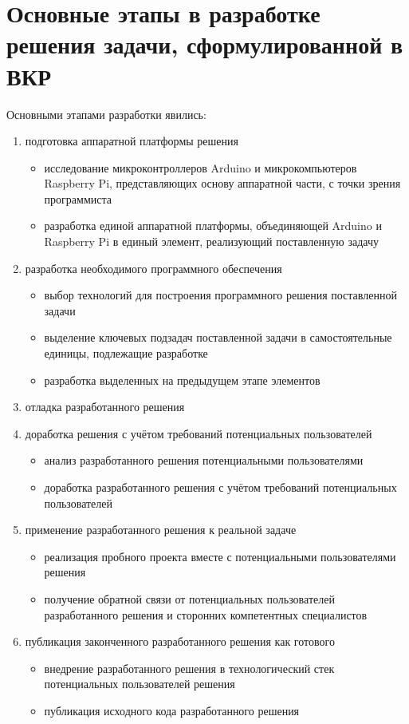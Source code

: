 \section{Основные этапы в разработке решения задачи, сформулированной в ВКР}
Основными этапами разработки явились:
\begin{enumerate}
\item подготовка аппаратной платформы решения 
\begin{itemize}
    \item исследование микроконтроллеров Arduino и микрокомпьютеров Raspberry Pi, представляющих основу аппаратной части, с точки зрения программиста
    \item разработка единой аппаратной платформы, объединяющей Arduino и Raspberry Pi в единый элемент, реализующий поставленную задачу
\end{itemize}

\item разработка необходимого программного обеспечения
\begin{itemize}
    \item выбор технологий для построения программного решения поставленной задачи
    \item выделение ключевых подзадач поставленной задачи в самостоятельные единицы, подлежащие разработке
    \item разработка выделенных на предыдущем этапе элементов
\end{itemize}

\item отладка разработанного решения

\item доработка решения с учётом требований потенциальных пользователей
\begin{itemize}
    \item анализ разработанного решения потенциальными пользователями
    \item доработка разработанного решения с учётом требований потенциальных пользователей
\end{itemize}

\item применение разработанного решения к реальной задаче  
\begin{itemize}
    \item реализация пробного проекта вместе с потенциальными пользователями решения
    \item получение обратной связи от потенциальных пользователей разработанного решения и сторонних компетентных специалистов
\end{itemize}

\item публикация законченного разработанного решения как готового
\begin{itemize}
    \item внедрение разработанного решения в технологический стек потенциальных пользователей решения
    \item публикация исходного кода разработанного решения
\end{itemize}
\end{enumerate}

